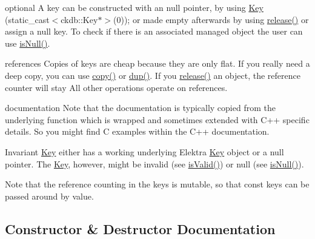 \begin{DoxyParagraph}{optional}
A key can be constructed with an null pointer, by using \mbox{\hyperlink{classkdb_1_1Key}{Key}} (static\+\_\+cast$<$ckdb\+::\+Key$\ast$$>$(0)); or made empty afterwards by using \mbox{\hyperlink{classkdb_1_1Key_a9ae719043e6e99f5f3d6fb85837306f8}{release()}} or assign a null key. To check if there is an associated managed object the user can use \mbox{\hyperlink{classkdb_1_1Key_ab70b89caae5fe1e9a2e774733576fa4c}{is\+Null()}}.
\end{DoxyParagraph}
\begin{DoxyParagraph}{references}
Copies of keys are cheap because they are only flat. If you really need a deep copy, you can use \mbox{\hyperlink{classkdb_1_1Key_ab5bc93e22f4cf40b9d2b1fc32cc260be}{copy()}} or \mbox{\hyperlink{classkdb_1_1Key_ababb1ccd9f18db379eb4a62f8db87bf5}{dup()}}. If you \mbox{\hyperlink{classkdb_1_1Key_a9ae719043e6e99f5f3d6fb85837306f8}{release()}} an object, the reference counter will stay All other operations operate on references.
\end{DoxyParagraph}
\begin{DoxyParagraph}{documentation}
Note that the documentation is typically copied from the underlying function which is wrapped and sometimes extended with C++ specific details. So you might find C examples within the C++ documentation.
\end{DoxyParagraph}
\begin{DoxyInvariant}{Invariant}
\mbox{\hyperlink{classkdb_1_1Key}{Key}} either has a working underlying Elektra \mbox{\hyperlink{classkdb_1_1Key}{Key}} object or a null pointer. The \mbox{\hyperlink{classkdb_1_1Key}{Key}}, however, might be invalid (see \mbox{\hyperlink{classkdb_1_1Key_a69e621790e5717c56f7275e0b8d5e27c}{is\+Valid()}}) or null (see \mbox{\hyperlink{classkdb_1_1Key_ab70b89caae5fe1e9a2e774733576fa4c}{is\+Null()}}).
\end{DoxyInvariant}
\begin{DoxyNote}{Note}
that the reference counting in the keys is mutable, so that const keys can be passed around by value. 
\end{DoxyNote}


\subsection{Constructor \& Destructor Documentation}
\mbox{\label{classkdb_1_1Key_a5679f5cae63caddd64a60388b9cc77fa}} 
